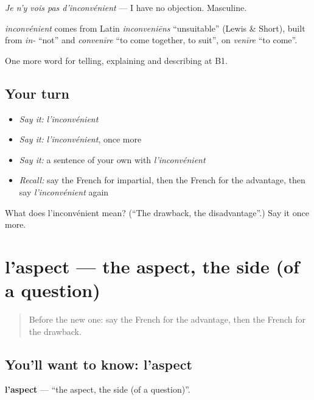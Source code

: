 \emph{Je n'y vois pas d'inconvénient} — I have no objection. Masculine.

\begin{cousinweb}
\emph{inconvénient} comes from Latin \emph{inconveniēns} \textquotedblleft{}unsuitable\textquotedblright{} (Lewis \& Short), built from \emph{in-} \textquotedblleft{}not\textquotedblright{} and \emph{convenīre} \textquotedblleft{}to come together, to suit\textquotedblright{}, on \emph{venīre} \textquotedblleft{}to come\textquotedblright{}.
\end{cousinweb}

\begin{grammarlens}[title={What you've built}]
One more word for telling, explaining and describing at B1.
\end{grammarlens}

\subsection*{Your turn}
\begin{itemize}
\raggedright
  \item \emph{Say it:} \emph{l'inconvénient}
  \item \emph{Say it:} \emph{l'inconvénient}, once more
  \item \emph{Say it:} a sentence of your own with \emph{l'inconvénient}
  \item \emph{Recall:} say the French for impartial, then the French for the advantage, then say \emph{l'inconvénient} again
\end{itemize}

\begin{tcolorbox}[breakable,colback=teal!4,colframe=teal!35!black,title={Before you move on}]
What does l'inconvénient mean? (\textquotedblleft{}The drawback, the disadvantage\textquotedblright{}.) Say it once more.
\end{tcolorbox}
\section[l'aspect]{l'aspect — the aspect, the side (of a question)}

\label{lesson:FR-C343-aspect}



\begin{quote}
Before the new one: say the French for the advantage, then the French for the drawback.
\end{quote}

\subsection*{You'll want to know: l'aspect}
\textbf{l'aspect} — \textquotedblleft{}the aspect, the side (of a question)\textquotedblright{}.

